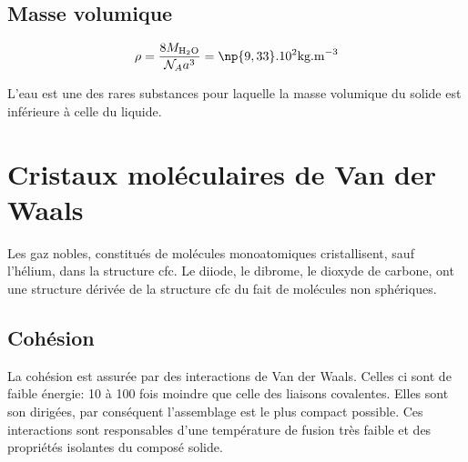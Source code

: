 \subsection{Masse volumique}
\begin{equation}
    \rho = \frac{8M_{\text{H}_2\text{O}}}{\mathcal{N}_A
        a^3} = \np{9,33}.10^2\text{kg.m}^{-3}
\end{equation}
\begin{rem}
    L'eau est une des rares substances pour laquelle la
    masse volumique du solide est inférieure à celle du
    liquide.
\end{rem}


\section{Cristaux moléculaires de Van der Waals}
Les gaz nobles, constitués de molécules monoatomiques
cristallisent, sauf l’hélium, dans la structure cfc.
Le diiode, le dibrome, le dioxyde de carbone, ont
une structure dérivée de la structure cfc du
fait de molécules non sphériques.
\subsection{Cohésion}
La cohésion est assurée par des interactions de
Van der Waals. Celles ci sont de faible énergie:
10 à 100 fois moindre que celle des liaisons covalentes.
Elles sont son dirigées, par conséquent l'assemblage
est le plus compact possible.
Ces interactions sont responsables d'une température de
fusion très faible et des propriétés isolantes du composé
solide.

